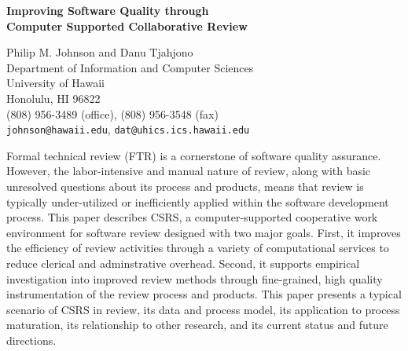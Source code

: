 






\pagestyle{empty}

\begin{figure} [htbp]
 {\centerline{}}
\end{figure}

\begin{center}
{\large\bf Improving Software Quality through\\
           Computer Supported Collaborative Review}

\medskip\par
Philip M. Johnson and Danu Tjahjono\\
Department of Information and Computer Sciences\\
University of Hawaii\\
Honolulu, HI 96822\\
(808) 956-3489 (office), (808) 956-3548 (fax)\\
{\tt johnson@hawaii.edu},
{\tt dat@uhics.ics.hawaii.edu}
\end{center}

Formal technical review (FTR) is a cornerstone of software quality
assurance.  However, the labor-intensive and manual nature of review, along
with basic unresolved questions about its process and products, means that
review is typically under-utilized or inefficiently applied within the
software development process.  This paper describes CSRS, a
computer-supported cooperative work environment for software review
designed with two major goals.  First, it improves the efficiency of review
activities through a variety of computational services to reduce clerical
and adminstrative overhead.  Second, it supports empirical investigation
into improved review methods through fine-grained, high quality
instrumentation of the review process and products.  This paper presents a
typical scenario of CSRS in review, its data and process model, its
application to process maturation, its relationship to other research, and
its current status and future directions.





